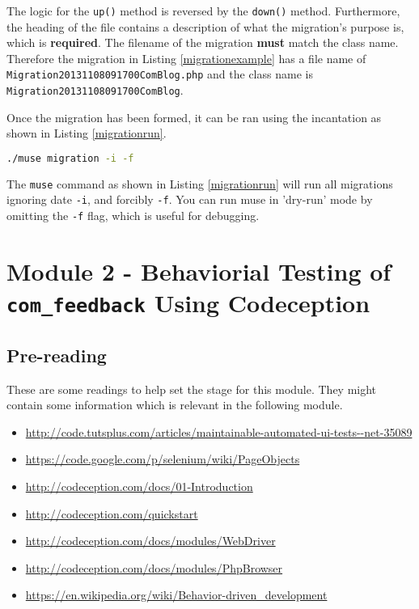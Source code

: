 \documentclass[10pt,letterpaper,titlepage]{article}
\begin{document}
The logic for the \texttt{up()} method is reversed by the \texttt{down()} method. Furthermore, the heading of the file contains a description of what the migration's purpose is, which is \textbf{required}.
The filename of the migration \textbf{must} match the class name. Therefore the migration in Listing \ref{migrationexample} has a file name of \texttt{Migration20131108091700ComBlog.php} and the class name is \texttt{Migration20131108091700ComBlog}.

Once the migration has been formed, it can be ran using the incantation as shown in Listing \ref{migrationrun}.
\begin{lstlisting}[caption={Running migrations to keep the database tables synchronized with upstream changes.},language=Bash,label=migrationrun]
./muse migration -i -f
\end{lstlisting}

The \texttt{muse} command as shown in Listing \ref{migrationrun} will run all migrations ignoring date \texttt{-i}, and forcibly \texttt{-f}. You can run muse in 'dry-run' mode by omitting the \texttt{-f} flag, which 
is useful for debugging.


\section{Module 2 - Behaviorial Testing of \texttt{com\_feedback} Using Codeception}

\subsection{Pre-reading}
These are some readings to help set the stage for this module. They might contain some information which is relevant in the following module.

\begin{itemize}
\item \url{http://code.tutsplus.com/articles/maintainable-automated-ui-tests--net-35089}
\item \url{https://code.google.com/p/selenium/wiki/PageObjects}
\item \url{http://codeception.com/docs/01-Introduction}
\item \url{http://codeception.com/quickstart}
\item \url{http://codeception.com/docs/modules/WebDriver}
\item \url{http://codeception.com/docs/modules/PhpBrowser}
\item \url{https://en.wikipedia.org/wiki/Behavior-driven_development}
\end{itemize}
\end{document}
